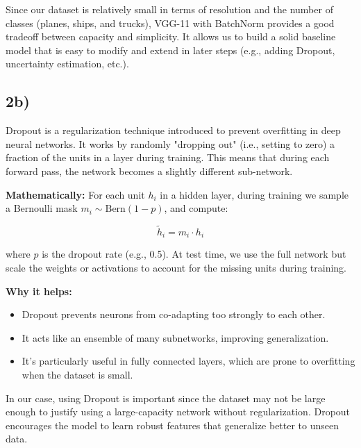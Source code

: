 \documentclass[10pt]{article}
\begin{document}
\noindent Since our dataset is relatively small in terms of resolution and the number of classes (planes, ships, and trucks), VGG-11 with BatchNorm provides a good tradeoff between capacity and simplicity. It allows us to build a solid baseline model that is easy to modify and extend in later steps (e.g., adding Dropout, uncertainty estimation, etc.).
\subsection*{2b)}

Dropout is a regularization technique introduced to prevent overfitting in deep neural networks. It works by randomly "dropping out" (i.e., setting to zero) a fraction of the units in a layer during training. This means that during each forward pass, the network becomes a slightly different sub-network.

\medskip

\noindent \textbf{Mathematically:} For each unit \( h_i \) in a hidden layer, during training we sample a Bernoulli mask \( m_i \sim \text{Bern}(1 - p) \), and compute:

\[
\tilde{h}_i = m_i \cdot h_i
\]

where \( p \) is the dropout rate (e.g., 0.5). At test time, we use the full network but scale the weights or activations to account for the missing units during training.

\medskip

\noindent \textbf{Why it helps:}
\begin{itemize}
  \item Dropout prevents neurons from co-adapting too strongly to each other.
  \item It acts like an ensemble of many subnetworks, improving generalization.
  \item It’s particularly useful in fully connected layers, which are prone to overfitting when the dataset is small.
\end{itemize}

\noindent In our case, using Dropout is important since the dataset may not be large enough to justify using a large-capacity network without regularization. Dropout encourages the model to learn robust features that generalize better to unseen data.
\end{document}
